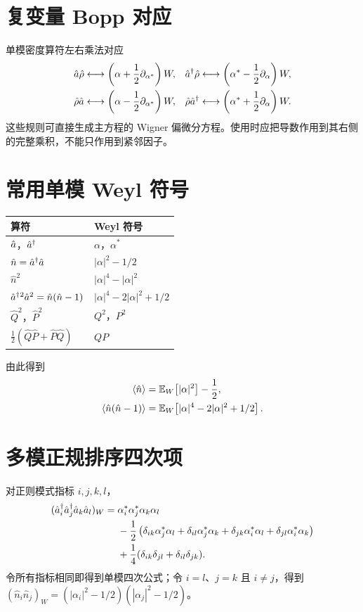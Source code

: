 \section{复变量 Bopp 对应}

单模密度算符左右乘法对应
\begin{align}
  \hat a\hat\rho &\longleftrightarrow
  \left(\alpha+\frac12\partial_{\alpha^*}\right)W,&
  \hat a^{\dagger}\hat\rho &\longleftrightarrow
  \left(\alpha^*-\frac12\partial_\alpha\right)W,\\
  \hat\rho\hat a &\longleftrightarrow
  \left(\alpha-\frac12\partial_{\alpha^*}\right)W,&
  \hat\rho\hat a^{\dagger} &\longleftrightarrow
  \left(\alpha^*+\frac12\partial_\alpha\right)W.
\end{align}
这些规则可直接生成主方程的 Wigner 偏微分方程。使用时应把导数作用到其右侧的完整乘积，不能只作用到紧邻因子。

\section{常用单模 Weyl 符号}

\begin{center}
\begin{tabular}{ll}
\toprule
算符 & Weyl 符号 \\
\midrule
$\hat a$，$\hat a^{\dagger}$ & $\alpha$，$\alpha^*$ \\
$\hat n=\hat a^{\dagger}\hat a$ & $|\alpha|^2-1/2$ \\
$\hat n^2$ & $|\alpha|^4-|\alpha|^2$ \\
$\hat a^{\dagger}{}^2\hat a^2=\hat n(\hat n-1)$
& $|\alpha|^4-2|\alpha|^2+1/2$ \\
$\hat Q^2$，$\hat P^2$ & $Q^2$，$P^2$ \\
$\tfrac12(\hat Q\hat P+\hat P\hat Q)$ & $QP$ \\
\bottomrule
\end{tabular}
\end{center}
由此得到
\begin{align}
  \left\langle \hat n\right\rangle&=\mathbb{E}_{W}\!\left[|\alpha|^2\right]-\frac12,\\
  \left\langle \hat n(\hat n-1)\right\rangle
  &=\mathbb{E}_{W}\!\left[|\alpha|^4-2|\alpha|^2+1/2\right].
\end{align}

\section{多模正规排序四次项}

对正则模式指标 $i,j,k,l$，
\begin{align}
  (\hat a^{\dagger}_i\hat a^{\dagger}_j\hat a_k\hat a_l)_W
  ={}&\alpha_i^*\alpha_j^*\alpha_k\alpha_l\\
  &-\frac12\left(
  \delta_{ik}\alpha_j^*\alpha_l+
  \delta_{il}\alpha_j^*\alpha_k+
  \delta_{jk}\alpha_i^*\alpha_l+
  \delta_{jl}\alpha_i^*\alpha_k\right)\\
  &+\frac14(\delta_{ik}\delta_{jl}+\delta_{il}\delta_{jk}).
\end{align}
令所有指标相同即得到单模四次公式；令 $i=l$、$j=k$ 且 $i\neq j$，得到
$(\hat n_i\hat n_j)_W=(|\alpha_i|^2-1/2)(|\alpha_j|^2-1/2)$。

